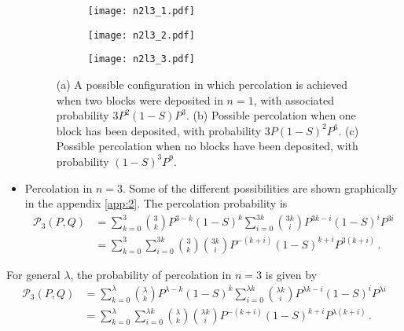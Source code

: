 \documentclass[amsmath,amssymb,amsfonts,aps,pre,preprint,superscriptaddress,bibnotes,showpacs,showkeys,longbibliography,nofootinbib]{revtex4-1}
\begin{document}
\begin{itemize}
    \begin{figure}[!ht]
    \centering
    \begin{subfigure}{.32\textwidth}
      \centering
      \texttt{[image: n2l3\_1.pdf]}
      \caption{}
      \label{fig:sub1}
    \end{subfigure}%
    \begin{subfigure}{.32\textwidth}
      \centering
      \texttt{[image: n2l3\_2.pdf]}
      \caption{}
      \label{fig:sub2}
    \end{subfigure}
    \begin{subfigure}{.32\textwidth}
      \centering
      \texttt{[image: n2l3\_3.pdf]}
      \caption{}
      \label{fig:sub3}
    \end{subfigure}
    \caption{(a) A possible configuration in which percolation is achieved when two blocks were deposited in $n=1$, with associated probability $3P^2 (1-S) P^3$. (b) Possible percolation when one block has been deposited, with probability $3P(1-S)^2 P^6$. (c) Possible percolation when no blocks have been deposited, with probability $(1-S)^3P^9$. }
    \label{fig:test1}
    \end{figure}
    \item Percolation in $n=3$. Some of the different possibilities are shown graphically in the appendix \ref{app:2}. The percolation probability is
    \begin{equation}
        \begin{split}
        \mathcal{P}_3(P,Q) &= \sum\limits_{k=0}^3{3 \choose k} P^{3-k} (1-S)^k \sum\limits_{i=0}^{3 k}{3 k \choose i} P^{3 k-i} (1-S)^i P^{3 i}\\
        &= \sum\limits_{k=0}^3 \sum\limits_{i=0}^{3 k} {3 \choose k} {3 k \choose i} P^{-(k+i)} (1-S)^{k+i} P^{3 (k+i)}\, .
        \end{split}
    \end{equation}
\end{itemize}
For general $\lambda$, the probability of percolation in $n=3$ is given by
\begin{equation}
    \begin{split}
    \mathcal{P}_3(P,Q) &= \sum\limits_{k=0}^\lambda{\lambda \choose k} P^{\lambda-k} (1-S)^k \sum\limits_{i=0}^{\lambda k}{\lambda k \choose i} P^{\lambda k-i} (1-S)^i P^{\lambda i}\\
    &= \sum\limits_{k=0}^\lambda \sum\limits_{i=0}^{\lambda k} {\lambda \choose k} {\lambda k \choose i} P^{-(k+i)} (1-S)^{k+i} P^{\lambda (k+i)}\, .
    \end{split}
\end{equation}
\end{document}
